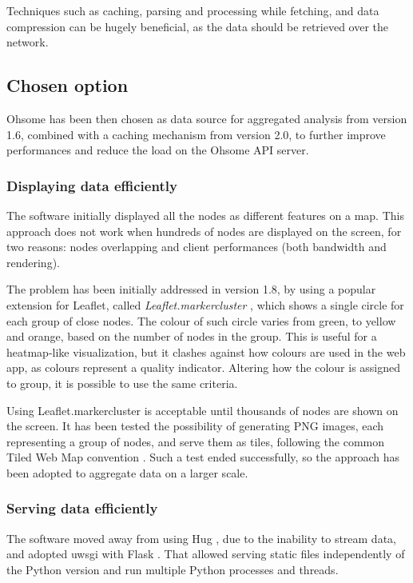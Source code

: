 \documentclass{Configuration_Files/PoliMi3i_thesis}
\begin{document}
Techniques such as caching, parsing and processing while fetching, and data compression can be hugely beneficial, as the data should be retrieved over the network.

\subsection{Chosen option}

Ohsome has been then chosen as data source for aggregated analysis from version 1.6, combined with a caching mechanism from version 2.0, to further improve performances and reduce the load on the Ohsome API server.

\subsubsection{Displaying data efficiently}

The software initially displayed all the nodes as different features on a map. This approach does not work when hundreds of nodes are displayed on the screen, for two reasons: nodes overlapping and client performances (both bandwidth and rendering). 

The problem has been initially addressed in version 1.8, by using a popular extension for Leaflet, called \textit{Leaflet.markercluster} \cite{LeafletMarkercluster2022}, which shows a single circle for each group of close nodes. The colour of such circle varies from green, to yellow and orange, based on the number of nodes in the group. This is useful for a heatmap-like visualization, but it clashes against how colours are used in the web app, as colours represent a quality indicator. Altering how the colour is assigned to group, it is possible to use the same criteria.

Using Leaflet.markercluster is acceptable until thousands of nodes are shown on the screen. It has been tested the possibility of generating PNG images, each representing a group of nodes, and serve them as tiles, following the common Tiled Web Map convention \cite{TiledWebMap2022}. Such a test ended successfully, so the approach has been adopted to aggregate data on a larger scale.

\subsubsection{Serving data efficiently}

The software moved away from using Hug \cite{HugapiHug2022}, due to the inability to stream data, and adopted uwsgi \cite{unbitUnbitUwsgi2022} with Flask \cite{Flask2022}. That allowed serving static files independently of the Python version and run multiple Python processes and threads.
\end{document}
